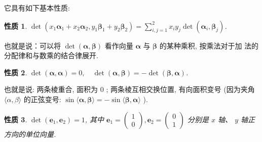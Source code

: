 \documentclass[10pt,punct]{ctexbeamer}
\newtheorem{pr1}{性质}
\begin{document}
\begin{frame}


    它具有如下基本性质:

    \begin{pr1}
        $\operatorname{det}\left(x_1 \boldsymbol{\alpha}_1+x_2 \boldsymbol{\alpha}_2, y_1 \boldsymbol{\beta}_1+y_2 \boldsymbol{\beta}_2\right)=\sum_{i, j=1}^2 x_i y_j \operatorname{det}\left(\boldsymbol{\alpha}_i, \boldsymbol{\beta}_j\right)$.
    \end{pr1}

    也就是说：可以将 $\operatorname{det}(\boldsymbol{\alpha}, \boldsymbol{\beta})$ 看作向量 $\boldsymbol{\alpha}$ 与 $\boldsymbol{\beta}$ 的某种乘积, 按乘法对于加 法的分配律和与数乘的结合律展开.


    \begin{pr1}
        $\operatorname{det}(\boldsymbol{\alpha}, \boldsymbol{\alpha})=0, \quad  \operatorname{det}(\boldsymbol{\alpha}, \boldsymbol{\beta})=-\operatorname{det}(\boldsymbol{\beta}, \boldsymbol{\alpha})$.
    \end{pr1}
    也就是说: 两条棱重合, 面积为 0 ; 两条棱互相交换位置, 有向面积变号 (因为夹角 $\langle\alpha, \beta\rangle$ 的正弦变号: $\sin \langle\boldsymbol{\alpha}, \boldsymbol{\beta}\rangle=-\sin \langle\boldsymbol{\beta}, \boldsymbol{\alpha}\rangle$ ).


    \begin{pr1}
        $\operatorname{det}\left(\boldsymbol{e}_1, \boldsymbol{e}_2\right)=1$,
        其中 $\boldsymbol{e}_1=\left(\begin{array}{l}1 \\ 0\end{array}\right), \boldsymbol{e}_2=\left(\begin{array}{l}0 \\ 1\end{array}\right)$ 分别是 $x$ 轴、 $y$ 轴正方向的单位向量.
    \end{pr1}


\end{frame}
\end{document}
